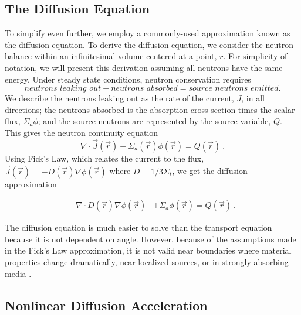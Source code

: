 \subsection{The Diffusion Equation}
To simplify even further, we employ a commonly-used approximation known as the diffusion equation. To derive the diffusion equation, we consider the neutron balance within an infinitesimal volume centered at a point, $r$. For simplicity of notation, we will present this derivation assuming all neutrons have the same energy. Under steady state conditions, neutron conservation requires
%
\begin{equation}
    \textit{neutrons leaking out} + \textit{neutrons absorbed} = \textit{source neutrons emitted}.
\end{equation}
We describe the neutrons leaking out as the rate of the current, $J$, in all directions; the neutrons absorbed is the absorption cross section times the scalar flux, $\Sigma_a\phi$; and the source neutrons are represented by the source variable, $Q$. This gives the neutron continuity equation
\begin{equation}

\nabla\cdot \vec{J}(\vec{r}) + \Sigma_a(\vec{r})\phi(\vec{r}) = Q(\vec{r})\:.

\end{equation}
Using Fick's Law, which relates the current to the flux, $\vec{J}(\vec{r}) = -D(\vec{r})\nabla\phi(\vec{r})$ where $D = 1/3\Sigma_t$, we get the diffusion approximation

\begin{equation}
\begin{split}
 - \nabla \cdot D(\vec{r})\nabla\phi(\vec{r}) &+ \Sigma_a \phi(\vec{r}) = Q(\vec{r})\:.
\end{split}
\label{eq:diffusion_fixed_source}
\end{equation}

The diffusion equation is much easier to solve than the transport equation because it is not dependent on angle. However, because of the assumptions made in the Fick's Law approximation, it is not valid near boundaries where material properties change dramatically, near localized sources, or in strongly absorbing media \cite{lewis-miller}.

\subsection{Nonlinear Diffusion Acceleration}


